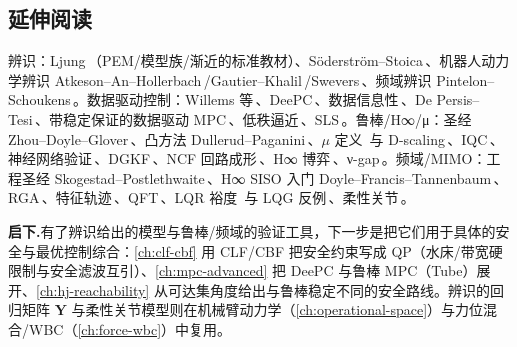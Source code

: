 \subsection*{延伸阅读}
辨识：Ljung\,\cite{ljung1999sysid}（PEM/模型族/渐近的标准教材）、Söderström--Stoica\,\cite{soderstrom1989sysid}、机器人动力学辨识 Atkeson--An--Hollerbach\,\cite{atkeson1986inertial}/Gautier--Khalil\,\cite{gautier1991identifiable}/Swevers\,\cite{swevers1997optimal}、频域辨识 Pintelon--Schoukens\,\cite{pintelon2012freqdomain}。数据驱动控制：Willems 等\,\cite{willems2005persistency}、DeePC\,\cite{coulson2019deepc,coulson2019regularized}、数据信息性\,\cite{vanwaarde2020informativity}、De Persis--Tesi\,\cite{depersis2020datadriven}、带稳定保证的数据驱动 MPC\,\cite{berberich2021ddmpc}、低秩逼近\,\cite{markovsky2019lowrank}、SLS\,\cite{anderson2019sls,dean2020sample}。鲁棒/H∞/μ：圣经 Zhou--Doyle--Glover\,\cite{zhou1996robust}、凸方法 Dullerud--Paganini\,\cite{dullerud2000convex}、$\mu$ 定义\,\cite{doyle1982mu} 与 D-scaling\,\cite{packard1993mu}、IQC\,\cite{megretski1997iqc}、神经网络验证\,\cite{fazlyab2019nn}、DGKF\,\cite{doyle1989dgkf}、NCF 回路成形\,\cite{glover1989ncf,mcfarlane1990loopshaping}、H∞ 博弈\,\cite{basar1995dynamic}、ν-gap\,\cite{vinnicombe2001uncertainty}。频域/MIMO：工程圣经 Skogestad--Postlethwaite\,\cite{skogestad2005multivariable}、H∞ SISO 入门 Doyle--Francis--Tannenbaum\,\cite{doyle1990feedback}、RGA\,\cite{bristol1966rga}、特征轨迹\,\cite{macfarlane1977characteristic}、QFT\,\cite{horowitz1963qft}、LQR 裕度\,\cite{kalman1964optimal} 与 LQG 反例\,\cite{doyle1978guaranteed}、柔性关节\,\cite{spong1987flexible}。

\noindent\textbf{启下.}\;有了辨识给出的模型与鲁棒/频域的验证工具，下一步是把它们用于具体的安全与最优控制综合：\cref{ch:clf-cbf} 用 CLF/CBF 把安全约束写成 QP（水床/带宽硬限制与安全滤波互引）、\cref{ch:mpc-advanced} 把 DeePC 与鲁棒 MPC（Tube）展开、\cref{ch:hj-reachability} 从可达集角度给出与鲁棒稳定不同的安全路线。辨识的回归矩阵 $\mathbf Y$ 与柔性关节模型则在机械臂动力学（\cref{ch:operational-space}）与力位混合/WBC（\cref{ch:force-wbc}）中复用。
